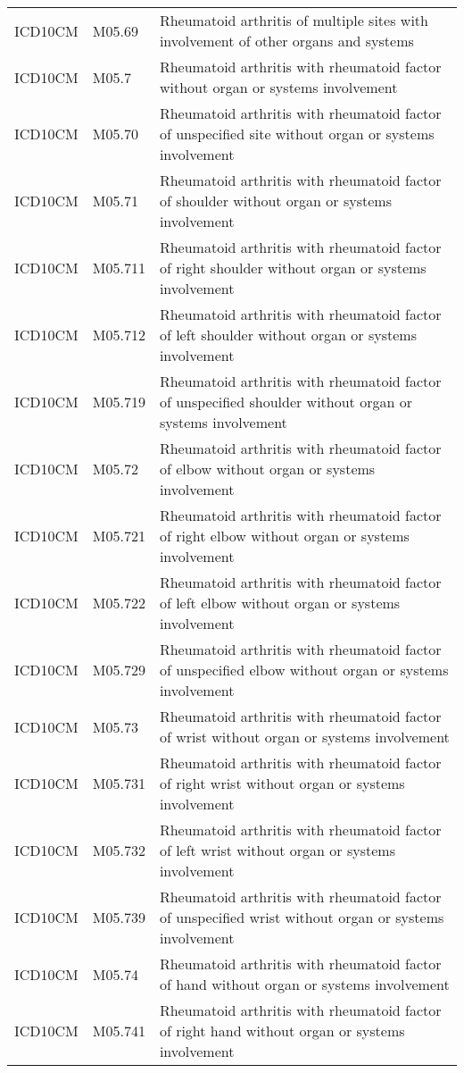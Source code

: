 \begin{table}[ht]
\begin{tabular}{lll}
  ICD10CM & M05.69 & Rheumatoid arthritis of multiple sites with involvement of other organs and systems \\ 
  ICD10CM & M05.7 & Rheumatoid arthritis with rheumatoid factor without organ or systems involvement \\ 
  ICD10CM & M05.70 & Rheumatoid arthritis with rheumatoid factor of unspecified site without organ or systems involvement \\ 
  ICD10CM & M05.71 & Rheumatoid arthritis with rheumatoid factor of shoulder without organ or systems involvement \\ 
  ICD10CM & M05.711 & Rheumatoid arthritis with rheumatoid factor of right shoulder without organ or systems involvement \\ 
  ICD10CM & M05.712 & Rheumatoid arthritis with rheumatoid factor of left shoulder without organ or systems involvement \\ 
  ICD10CM & M05.719 & Rheumatoid arthritis with rheumatoid factor of unspecified shoulder without organ or systems involvement \\ 
  ICD10CM & M05.72 & Rheumatoid arthritis with rheumatoid factor of elbow without organ or systems involvement \\ 
  ICD10CM & M05.721 & Rheumatoid arthritis with rheumatoid factor of right elbow without organ or systems involvement \\ 
  ICD10CM & M05.722 & Rheumatoid arthritis with rheumatoid factor of left elbow without organ or systems involvement \\ 
  ICD10CM & M05.729 & Rheumatoid arthritis with rheumatoid factor of unspecified elbow without organ or systems involvement \\ 
  ICD10CM & M05.73 & Rheumatoid arthritis with rheumatoid factor of wrist without organ or systems involvement \\ 
  ICD10CM & M05.731 & Rheumatoid arthritis with rheumatoid factor of right wrist without organ or systems involvement \\ 
  ICD10CM & M05.732 & Rheumatoid arthritis with rheumatoid factor of left wrist without organ or systems involvement \\ 
  ICD10CM & M05.739 & Rheumatoid arthritis with rheumatoid factor of unspecified wrist without organ or systems involvement \\ 
  ICD10CM & M05.74 & Rheumatoid arthritis with rheumatoid factor of hand without organ or systems involvement \\ 
  ICD10CM & M05.741 & Rheumatoid arthritis with rheumatoid factor of right hand without organ or systems involvement \\ 

\end{tabular}
\end{table}
